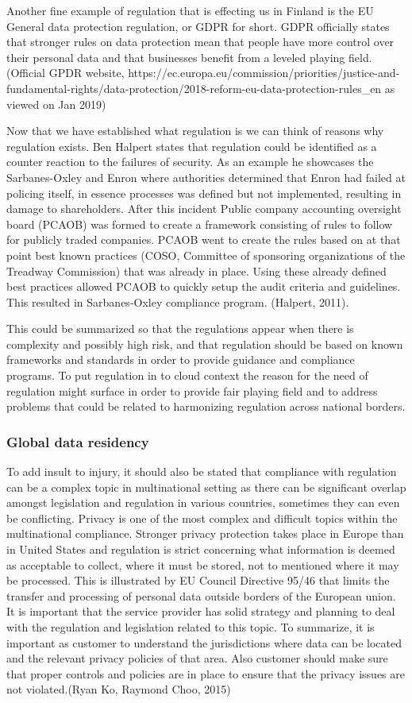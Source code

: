 \documentclass{article}
\begin{document}
Another fine example of regulation that is effecting us in Finland is the EU General data protection regulation, or GDPR for short. GDPR officially states that stronger rules on data protection mean that people have more control over their personal data and that businesses benefit from a leveled playing field. (Official GPDR website, https://ec.europa.eu/commission/priorities/justice-and-fundamental-rights/data-protection/2018-reform-eu-data-protection-rules\_en as viewed on Jan 2019)
\par
Now that we have established what regulation is we can think of reasons why regulation exists. Ben Halpert states that regulation could be identified as a counter reaction to the failures of security. As an example he showcases the Sarbanes-Oxley and Enron where authorities determined that Enron had failed at policing itself, in essence processes was defined but not implemented, resulting in damage to shareholders. After this incident Public company accounting oversight board (PCAOB) was formed to create a framework consisting of rules to follow for publicly traded companies.
PCAOB went to create the rules based on at that point best known practices (COSO, Committee of sponsoring organizations of the Treadway Commission) that was already in place. Using these already defined best practices allowed PCAOB to quickly setup the audit criteria and guidelines. This resulted in Sarbanes-Oxley compliance program.
(Halpert, 2011).
\par
This could be summarized so that the regulations appear when there is complexity and possibly high risk, and that regulation should be based on known frameworks and standards in order to provide guidance and compliance programs.
To put regulation in to cloud context the reason for the need of regulation might surface in order to provide fair playing field and to address problems that could be related to harmonizing regulation across national borders.
\subsubsection{Global data residency}
To add insult to injury, it should also be stated that compliance with regulation can be a complex topic in multinational setting as there can be significant overlap amongst legislation and regulation in various countries, sometimes they can even be conflicting. Privacy is one of the most complex and difficult topics within the multinational compliance. Stronger privacy protection takes place in Europe than in United States and regulation is strict concerning what information is deemed as acceptable to collect, where it must be stored, not to mentioned where it may be processed. This is illustrated by EU Council Directive 95/46 that limits the transfer and processing of personal data outside borders of the European union. It is important that the service provider has solid strategy and planning to deal with the regulation and legislation related to this topic. To summarize, it is important as customer to understand the jurisdictions where data can be located and the relevant privacy policies of that area. Also customer should make sure that proper controls and policies are in place to ensure that the privacy issues are not violated.(Ryan Ko, Raymond Choo, 2015)
\end{document}
